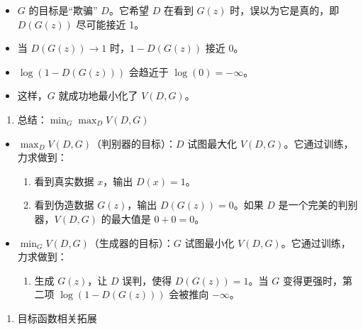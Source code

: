 \begin{itemize}
\begin{itemize}
    \begin{itemize}
    \tightlist
    \item
      \(G\) 的目标是``欺骗'' \(D\)。它希望 \(D\) 在看到 \(G(z)\) 时，误以为它是真的，即 \(D(G(z))\) 尽可能接近 1。
    \item
      当 \(D(G(z))\to 1\) 时，\(1-D(G(z))\) 接近 0。
    \item
      \(\log(1-D(G(z)))\) 会趋近于 \(\log(0)=-\infty\)。
    \item
      这样，\(G\) 就成功地最小化了 \(V(D,G)\)。
    \end{itemize}
  \end{itemize}
\end{itemize}

\begin{enumerate}
\def\labelenumi{\arabic{enumi}.}
\setcounter{enumi}{3}
\tightlist
\item
  总结：\(\min_G \max_D V(D,G)\)
\end{enumerate}

\begin{itemize}
\tightlist
\item
  \(\max_D V(D,G)\)（判别器的目标）：\(D\) 试图最大化 \(V(D,G)\)。它通过训练，力求做到：

  \begin{enumerate}
  \def\labelenumi{\arabic{enumi}.}
  \tightlist
  \item
    看到真实数据 \(x\)，输出 \(D(x)=1\)。
  \item
    看到伪造数据 \(G(z)\)，输出 \(D(G(z))=0\)。如果 \(D\) 是一个完美的判别器，\(V(D,G)\) 的最大值是 \(0+0=0\)。
  \end{enumerate}
\item
  \(\min_G V(D,G)\)（生成器的目标）：\(G\) 试图最小化 \(V(D,G)\)。它通过训练，力求做到：

  \begin{enumerate}
  \def\labelenumi{\arabic{enumi}.}
  \tightlist
  \item
    生成 \(G(z)\)，让 \(D\) 误判，使得 \(D(G(z))=1\)。当 \(G\) 变得更强时，第二项 \(\log(1-D(G(z)))\) 会被推向 \(-\infty\)。
  \end{enumerate}
\end{itemize}

\begin{enumerate}
\def\labelenumi{\arabic{enumi}.}
\setcounter{enumi}{4}
\tightlist
\item
  目标函数相关拓展
\end{enumerate}

